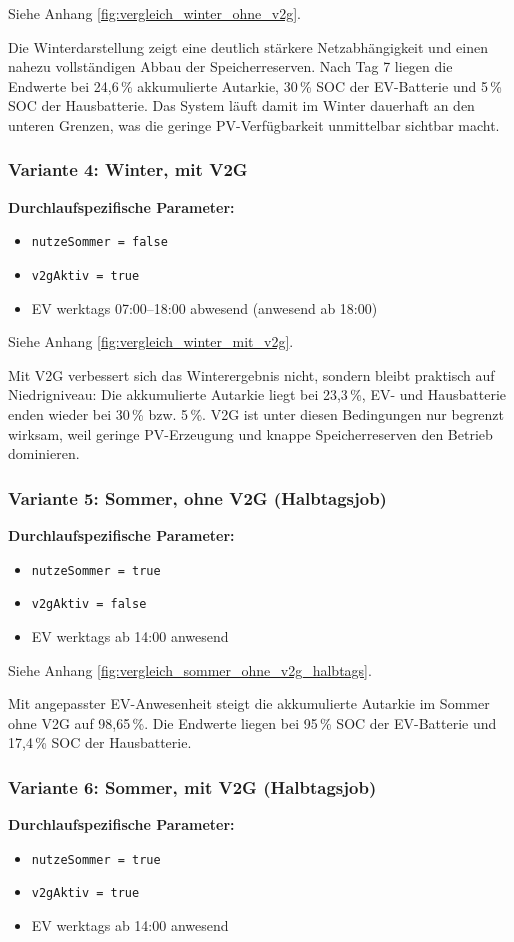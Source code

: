 \documentclass[conference]{IEEEtran}
\begin{document}
Siehe Anhang \ref{fig:vergleich_winter_ohne_v2g}.

Die Winterdarstellung zeigt eine deutlich stärkere Netzabhängigkeit und einen nahezu vollständigen Abbau der Speicherreserven. Nach Tag 7 liegen die Endwerte bei 24,6\,\% akkumulierte Autarkie, 30\,\% SOC der EV-Batterie und 5\,\% SOC der Hausbatterie. Das System läuft damit im Winter dauerhaft an den unteren Grenzen, was die geringe PV-Verfügbarkeit unmittelbar sichtbar macht.

\subsubsection{Variante 4: Winter, mit V2G}
\textbf{Durchlaufspezifische Parameter:}
\begin{itemize}
\item \texttt{nutzeSommer = false}
\item \texttt{v2gAktiv = true}
\item EV werktags 07:00--18:00 abwesend (anwesend ab 18:00)
\end{itemize}

Siehe Anhang \ref{fig:vergleich_winter_mit_v2g}.

Mit V2G verbessert sich das Winterergebnis nicht, sondern bleibt praktisch auf Niedrigniveau: Die akkumulierte Autarkie liegt bei 23,3\,\%, EV- und Hausbatterie enden wieder bei 30\,\% bzw. 5\,\%. V2G ist unter diesen Bedingungen nur begrenzt wirksam, weil geringe PV-Erzeugung und knappe Speicherreserven den Betrieb dominieren.

\subsubsection{Variante 5: Sommer, ohne V2G (Halbtagsjob)}
\textbf{Durchlaufspezifische Parameter:}
\begin{itemize}
\item \texttt{nutzeSommer = true}
\item \texttt{v2gAktiv = false}
\item EV werktags ab 14:00 anwesend
\end{itemize}

Siehe Anhang \ref{fig:vergleich_sommer_ohne_v2g_halbtags}.

Mit angepasster EV-Anwesenheit steigt die akkumulierte Autarkie im Sommer ohne V2G auf 98,65\,\%. Die Endwerte liegen bei 95\,\% SOC der EV-Batterie und 17,4\,\% SOC der Hausbatterie.

\subsubsection{Variante 6: Sommer, mit V2G (Halbtagsjob)}
\textbf{Durchlaufspezifische Parameter:}
\begin{itemize}
\item \texttt{nutzeSommer = true}
\item \texttt{v2gAktiv = true}
\item EV werktags ab 14:00 anwesend
\end{itemize}
\end{document}
